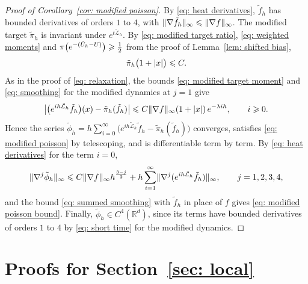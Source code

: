 \begin{proof}[Proof of Corollary~\ref{cor: modified poisson}]
    By \eqref{eq: heat derivatives}, $\tilde f_h$ has bounded derivatives of orders $1$ to $4$, with $\lVert \nabla \tilde f_h \rVert_\infty \leqslant \lVert \nabla f \rVert_\infty$. The modified target $\tilde\pi_h$ is invariant under $e^{t\tilde{\mathcal L}_h}$. By \eqref{eq: modified target ratio}, \eqref{eq: weighted moments} and $\pi\bigl( e^{-(\tilde U_h - U)} \bigr) \geqslant \frac12$ from the proof of Lemma~\ref{lem: shifted bias},
    \begin{equation}
        \tilde\pi_h\bigl( 1 + |x| \bigr) \leqslant C .
        \label{eq: modified target moment}
    \end{equation}
    As in the proof of \eqref{eq: relaxation}, the bounds \eqref{eq: modified target moment} and \eqref{eq: smoothing} for the modified dynamics at $j = 1$ give
    \begin{equation}
        \bigl| \bigl( e^{ih\tilde{\mathcal L}_h} \tilde f_h \bigr)(x) - \tilde\pi_h(\tilde f_h) \bigr| \leqslant C \lVert \nabla f \rVert_\infty (1 + |x|)\, e^{-\lambda i h} , \qquad i \geqslant 0 .
        \label{eq: modified relaxation}
    \end{equation}
    Hence the series $\tilde\phi_h = h \sum_{i=0}^{\infty} \bigl( e^{ih\tilde{\mathcal L}_h} \tilde f_h - \tilde\pi_h(\tilde f_h) \bigr)$ converges, satisfies \eqref{eq: modified poisson} by telescoping, and is differentiable term by term. By \eqref{eq: heat derivatives} for the term $i = 0$,
    \begin{equation*}
        \lVert \nabla^j \tilde\phi_h \rVert_\infty \leqslant C \lVert \nabla f \rVert_\infty h^{\frac{3-j}{2}} + h \sum_{i=1}^{\infty} \lVert \nabla^j ( e^{ih\tilde{\mathcal L}_h} \tilde f_h ) \rVert_\infty , \qquad j = 1, 2, 3, 4 ,
    \end{equation*}
    and the bound \eqref{eq: summed smoothing} with $\tilde f_h$ in place of $f$ gives \eqref{eq: modified poisson bound}. Finally, $\tilde\phi_h \in C^4(\mathbb R^d)$, since its terms have bounded derivatives of orders $1$ to $4$ by \eqref{eq: short time} for the modified dynamics.
\end{proof}

\section{Proofs for Section~\ref{sec: local}}
\label{app: local}

